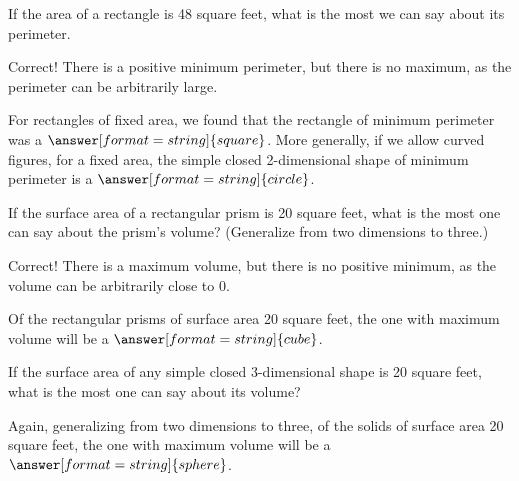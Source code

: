 \documentclass[nooutcomes]{ximera}
\begin{document}
\begin{problem}
If the area of a rectangle is 48 square feet, what is the most we can say about its perimeter. 

\begin{selectAll}
\end{selectAll}

\begin{problem}
Correct!  There is a positive minimum perimeter, but there is no maximum, as the perimeter can be arbitrarily large.  

For rectangles of fixed area, we found that the rectangle of minimum perimeter was a 
$\answer[format=string]{square}$.  More generally, if we allow curved figures, for a fixed area, the simple closed 2-dimensional shape of minimum perimeter is a $\answer[format=string]{circle}$.  
\end{problem}
\end{problem}

\begin{problem}
If the surface area of a rectangular prism is 20 square feet, what is the most one can say about the prism's volume?  (Generalize from two dimensions to three.) 

\begin{selectAll}
\end{selectAll}

\begin{problem}

Correct!  There is a maximum volume, but there is no positive minimum, as the volume can be arbitrarily close to 0.  

Of the rectangular prisms of surface area 20 square feet, the one with maximum volume will be a $\answer[format=string]{cube}$.

\begin{problem}
If the surface area of any simple closed 3-dimensional shape is 20 square feet, what is the most one can say about its volume? 

Again, generalizing from two dimensions to three, of the solids of surface area 20 square feet, the one with maximum volume will be a $\answer[format=string]{sphere}$.
\end{problem}
\end{problem}
\end{problem}
\end{document}
